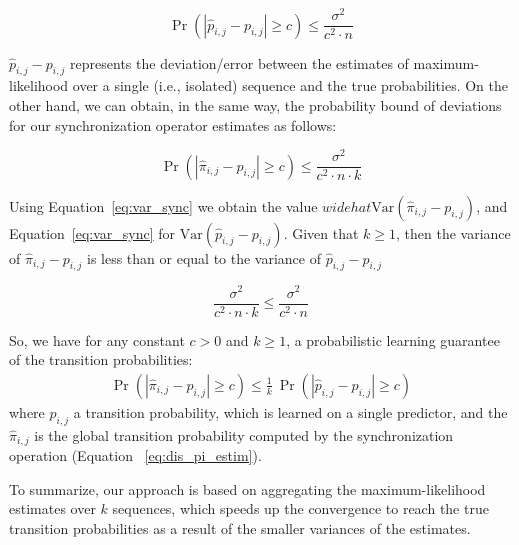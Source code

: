  \[ \Pr\left( |\hat{p}_{i,j} - {p}_{i,j}| \geq c \right) \leq
 \frac{\sigma^{2}}{c^2 \cdot n} \]
 
 
$\hat{p}_{i,j} - {p}_{i,j}$  represents the deviation/error between the estimates of maximum-likelihood over a single (i.e., isolated) sequence and the true probabilities. On the other hand, we can obtain, in the same way, the probability bound of deviations for our synchronization operator estimates as follows:

\[ \Pr\left( |\hat{\pi}_{i,j} - {p}_{i,j}| \geq c \right) \leq
\frac{\sigma^{2}}{c^2 \cdot n \cdot k} \]


\par Using Equation~\ref{eq:var_sync} we obtain the value $widehat\mathrm{Var} (\hat{\pi}_{i,j} - {p}_{i,j})$, and Equation~\ref{eq:var_sync} for $\mathrm{Var} (\hat{p}_{i,j} - {p}_{i,j})$. Given that $k \ge 1$, then  the variance of $\hat{\pi}_{i,j} - {p}_{i,j}$  is less than or equal to the variance of $\hat{p}_{i,j} - {p}_{i,j}$

\[ 
\frac{\sigma^{2}}{c^2 \cdot n \cdot k} \leq
\frac{\sigma^{2}}{c^2 \cdot n}
 \]

So, we have for any constant $c > 0$ and $k \ge 1$, a probabilistic learning guarantee of the transition probabilities: 
\begin{equation}
\begin{aligned}
\label{eq:guarantee}
 \Pr\left( |\hat{\pi}_{i,j} - {p}_{i,j}| \geq c \right) \leq
 \frac{1}{k}\ \Pr\left( |\hat{p}_{i,j} - {p}_{i,j}| \geq c \right)
 \end{aligned}
 \end{equation}
 where $\hat{p}_{i,j}$ a transition probability, which is learned on a single \pmcmr predictor, and the $\hat{\pi}_{i,j}$ is the global transition probability computed by the synchronization operation (Equation ~\ref{eq:dis_pi_estim}).
 \par To summarize, our approach is based on aggregating the maximum-likelihood estimates over $k$ sequences, which speeds up the convergence to reach the true transition probabilities as a result of the smaller variances of the estimates.


